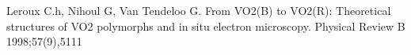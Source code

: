 %

\begin{thebibliography}{9}
      Leroux C.h, Nihoul G, Van Tendeloo G.
      From VO2(B) to VO2(R): Theoretical structures of VO2 polymorphs and in situ electron microscopy.
      Physical Review B 1998;57(9),5111
\end{thebibliography}
